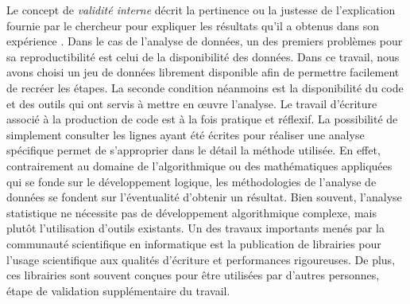 Le concept de \textit{validité interne} décrit la pertinence ou la justesse de l'explication fournie par le chercheur pour expliquer les résultats qu'il a obtenus dans son expérience \citep{Yin2009a}. Dans le cas de l'analyse de données, un des premiers problèmes pour sa reproductibilité est celui de la disponibilité des données. Dans ce travail, nous avons choisi un jeu de données librement disponible afin de permettre facilement de recréer les étapes. La seconde condition néanmoins est la disponibilité du code et des outils qui ont servis à mettre en œuvre l'analyse. Le travail d'écriture associé à la production de code est à la fois pratique et réflexif. La possibilité de simplement consulter les lignes ayant été écrites pour réaliser une analyse spécifique permet de s'approprier dans le détail la méthode utilisée. En effet, contrairement au domaine de l'algorithmique ou des mathématiques appliquées qui se fonde sur le développement logique, les méthodologies de l'analyse de données se fondent sur l'éventualité d'obtenir un résultat. Bien souvent, l'analyse statistique ne nécessite pas de développement algorithmique complexe, mais plutôt l'utilisation d'outils existants. Un des travaux importants menés par la communauté scientifique en informatique est la publication de librairies pour l'usage scientifique aux qualités d'écriture et performances rigoureuses. De plus, ces librairies sont souvent conçues pour être utilisées par d'autres personnes, étape de validation supplémentaire du travail. 

